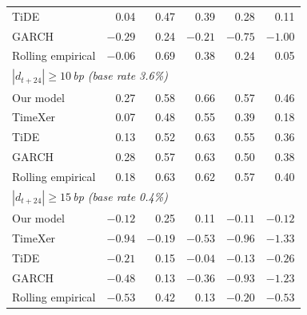 \begin{table}[pos=!htbp,align=\centering]
\begin{tabular}{lrrrrr}
TiDE & 0.04 & 0.47 & 0.39 & 0.28 & 0.11 \\
GARCH & $-0.29$ & 0.24 & $-0.21$ & $-0.75$ & $-1.00$ \\
Rolling empirical & $-0.06$ & 0.69 & 0.38 & 0.24 & 0.05 \\
\multicolumn{6}{l}{\emph{$|d_{t+24}|\geq10$\,bp (base rate 3.6\%)}} \\
Our model & 0.27 & 0.58 & 0.66 & 0.57 & 0.46 \\
TimeXer & 0.07 & 0.48 & 0.55 & 0.39 & 0.18 \\
TiDE & 0.13 & 0.52 & 0.63 & 0.55 & 0.36 \\
GARCH & 0.28 & 0.57 & 0.63 & 0.50 & 0.38 \\
Rolling empirical & 0.18 & 0.63 & 0.62 & 0.57 & 0.40 \\
\multicolumn{6}{l}{\emph{$|d_{t+24}|\geq15$\,bp (base rate 0.4\%)}} \\
Our model & $-0.12$ & 0.25 & 0.11 & $-0.11$ & $-0.12$ \\
TimeXer & $-0.94$ & $-0.19$ & $-0.53$ & $-0.96$ & $-1.33$ \\
TiDE & $-0.21$ & 0.15 & $-0.04$ & $-0.13$ & $-0.26$ \\
GARCH & $-0.48$ & 0.13 & $-0.36$ & $-0.93$ & $-1.23$ \\
Rolling empirical & $-0.53$ & 0.42 & 0.13 & $-0.20$ & $-0.53$ \\
\bottomrule
\end{tabular}
\end{table}
